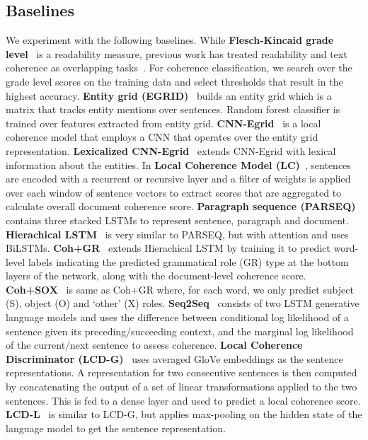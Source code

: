 \documentclass[11pt]{article}
\begin{document}
\subsection{Baselines}
\label{subsec:baseline}
We experiment with the following baselines. While \textbf{Flesch-Kincaid grade level}~\cite{kincaid1975derivation} is a readability measure, previous work has treated readability and text coherence as overlapping tasks~\cite{barzilay2008modeling,mesgar2015graph}. For coherence classification, we search over the grade level scores on the training data and select thresholds that result in the highest accuracy.  \textbf{Entity grid (EGRID)}~\cite{barzilay2008modeling} builds an  entity grid which is a matrix that tracks entity mentions over sentences. Random forest classifier is trained over features extracted from  entity grid. 
\textbf{CNN-Egrid}~\cite{nguyen2017neural} is a local coherence model that employs a CNN that operates over the entity grid representation. 
\textbf{Lexicalized CNN-Egrid}~\cite{mohiuddin2018coherence} extends CNN-Egrid with lexical information about the entities.  In \textbf{Local Coherence Model (LC)}~\cite{li2014model}, sentences are encoded with a recurrent or recursive layer and a filter of weights is applied over each window of sentence vectors to extract  scores that are aggregated to calculate overall document coherence score.  \textbf{Paragraph sequence (PARSEQ)}~\cite{lai2018discourse} contains three stacked LSTMs to represent sentence, paragraph and document.  \textbf{Hierachical LSTM}~\cite{farag2019multi} is very similar to PARSEQ, but with attention and uses BiLSTMs.  \textbf{Coh+GR}~\cite{farag2019multi} extends Hierachical LSTM by training it to predict word-level labels indicating the predicted grammatical role (GR) type at the bottom layers of the network, along with the document-level coherence score. 
\textbf{Coh+SOX}~\cite{farag2019multi} is same as Coh+GR where, for each word, we only predict subject (S), object (O) and `other' (X) roles.  \textbf{Seq2Seq}~\cite{li2017neural} consists of two LSTM generative language models and uses the difference between conditional log likelihood of a sentence given its preceding/succeeding context, and the marginal log likelihood of the current/next sentence to assess coherence. 
\textbf{Local Coherence Discriminator (LCD-G)}~\cite{xu2019cross} uses averaged GloVe embeddings as the sentence representations. A representation for two consecutive sentences is then computed by concatenating the output of a set of linear transformations applied to the two sentences. This is fed to a dense layer and used to predict a local coherence score. \textbf{LCD-L}~\cite{xu2019cross} is similar to LCD-G, but applies max-pooling on the hidden state of the language model to get the sentence representation. 
\end{document}
